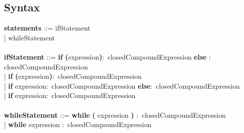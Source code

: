     \subsection{Syntax}
        \begin{tabbing}
        {\bf statements}                  ::= \=ifStatement\\
                                          \>| whileStatement\\
        \\
        {\bf ifStatement}                 ::= \=\textbf{if} \=\textbf{(}expression\textbf{)}$\colon$ closedCompoundExpression \textbf    {else} $\colon$ closedCompoundExpression\\
                                      \>| \textbf{if} \textbf{(}expression\textbf{)}$\colon$ closedCompoundExpression\\
                                      \>| \textbf{if} expression$\colon$ closedCompoundExpression \textbf{else}$\colon$ closedCompoundExpression\\
                                      \>| \textbf{if} expression$\colon$ closedCompoundExpression\\
        \\
        {\bf whileStatement}              ::= \=\textbf{while} \textbf{(} expression \textbf{)} $\colon$ closedCompoundExpression\\
                                      \>| \textbf{while} expression $\colon$ closedCompoundExpression\\
        \\ 
        \end{tabbing}
